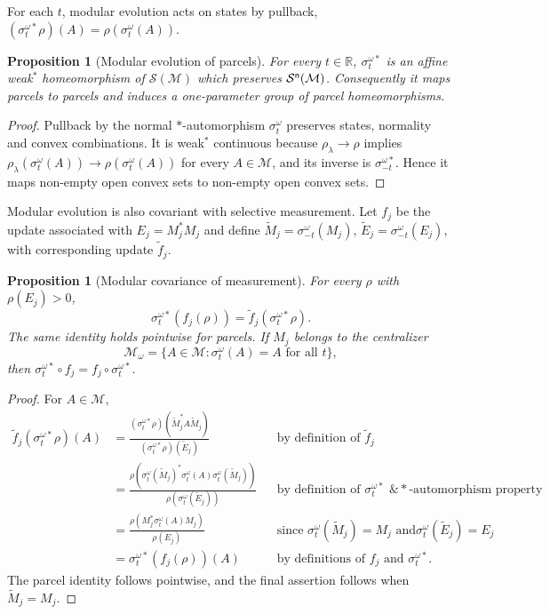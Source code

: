 \documentclass[11pt]{article}
\newtheorem{proposition}[theorem]{Proposition}
\begin{document}
For each $t$, modular evolution acts on states by pullback,
$(\sigma_t^{\omega *}\rho)(A)=\rho(\sigma_t^\omega(A))$.

\begin{proposition}[Modular evolution of parcels]
\label{prop:modularliftsparcel}
For every $t\in\mathbb R$, $\sigma_t^{\omega *}$ is an affine weak$^*$
homeomorphism of $\mathcal S(\mathcal M)$ which preserves
$\mathcal S^{\sf n}(\mathcal M)$. Consequently it maps parcels to parcels
and induces a one-parameter group of parcel homeomorphisms.
\end{proposition}

\begin{proof}
Pullback by the normal $*$-automorphism $\sigma_t^\omega$ preserves states,
normality and convex combinations. It is weak$^*$ continuous because
$\rho_\lambda\to\rho$ implies
$\rho_\lambda(\sigma_t^\omega(A))\to\rho(\sigma_t^\omega(A))$ for every
$A\in\mathcal M$, and its inverse is $\sigma_{-t}^{\omega *}$. Hence it
maps non-empty open convex sets to non-empty open convex sets.
\end{proof}

Modular evolution is also covariant with selective measurement. Let $f_j$
be the update associated with $E_j=M_j^*M_j$ and define
$\widetilde M_j=\sigma_{-t}^\omega(M_j)$,
$\widetilde E_j=\sigma_{-t}^\omega(E_j)$, with corresponding update
$\widetilde f_j$.

\begin{proposition}[Modular covariance of measurement]
\label{prop:covariancemodular}
For every $\rho$ with $\rho(E_j)>0$,
\[
\sigma_t^{\omega *}(f_j(\rho))
=
\widetilde f_j(\sigma_t^{\omega *}\rho).
\]
The same identity holds pointwise for parcels. If $M_j$ belongs to the
centralizer
\[
\mathcal M_\omega
=
\{A\in\mathcal M:\sigma_t^\omega(A)=A\text{ for all }t\},
\]
then $\sigma_t^{\omega *}\circ f_j=f_j\circ\sigma_t^{\omega *}$.
\end{proposition}

\begin{proof}
For $A\in\mathcal M$,
\[
\begin{aligned}
\widetilde f_j(\sigma_t^{\omega *}\rho)(A)
&=
\frac{
(\sigma_t^{\omega *}\rho)
(\widetilde M_j^*A\widetilde M_j)}
{(\sigma_t^{\omega *}\rho)(\widetilde E_j)}
&&
\text{by definition of $\widetilde f_j$}
\\[1ex]
&=
\frac{
\rho\!\left(
\sigma_t^\omega(\widetilde M_j)^*
\sigma_t^\omega(A)
\sigma_t^\omega(\widetilde M_j)
\right)}
{\rho(\sigma_t^\omega(\widetilde E_j))}
&&
\text{by definition of $\sigma_t^{\omega *}$ \&
$*$-automorphism property}
\\[1ex]
&=
\frac{\rho(M_j^*\sigma_t^\omega(A)M_j)}
{\rho(E_j)}
&&
\text{since $\sigma_t^\omega(\widetilde M_j)=M_j$ and
$\sigma_t^\omega(\widetilde E_j)=E_j$}
\\[1ex]
&=
\sigma_t^{\omega *}(f_j(\rho))(A)
&&
\text{by definitions of $f_j$ and $\sigma_t^{\omega *}$.}
\end{aligned}
\]
The parcel identity follows pointwise, and the final assertion follows
when $\widetilde M_j=M_j$.
\end{proof}
\end{document}
